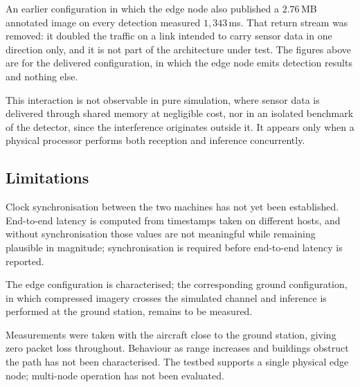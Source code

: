 An earlier configuration in which the edge node also published a
\(2.76\)\,MB annotated image on every detection measured \(1{,}343\)\,ms. That
return stream was removed: it doubled the traffic on a link intended to carry
sensor data in one direction only, and it is not part of the architecture under
test. The figures above are for the delivered configuration, in which the edge
node emits detection results and nothing else.

This interaction is not observable in pure simulation, where sensor data is
delivered through shared memory at negligible cost, nor in an isolated benchmark
of the detector, since the interference originates outside it. It appears only
when a physical processor performs both reception and inference concurrently.

\subsection{Limitations}
\label{sec:hitl-limitations}

Clock synchronisation between the two machines has not yet been established.
End-to-end latency is computed from timestamps taken on different hosts, and
without synchronisation those values are not meaningful while remaining plausible
in magnitude; synchronisation is required before end-to-end latency is reported.

The edge configuration is characterised; the corresponding ground configuration,
in which compressed imagery crosses the simulated channel and inference is
performed at the ground station, remains to be measured.

Measurements were taken with the aircraft close to the ground station, giving
zero packet loss throughout. Behaviour as range increases and buildings obstruct
the path has not been characterised. The testbed supports a single physical edge
node; multi-node operation has not been evaluated.
